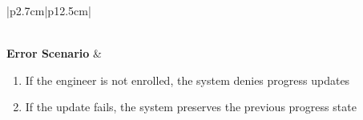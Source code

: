 \begin{table}[H]
\begin{tabular}{|p{2.7cm}|p{12.5cm}|}
\begin{minipage}[t]{\linewidth}
\begin{enumerate}[topsep=0pt,itemsep=1pt,parsep=0pt,partopsep=0pt]
                                          \end{enumerate}
                                      \end{minipage}          \\
            \hline
            \textbf{Error Scenario} & \begin{minipage}[t]{\linewidth}
                                          \begin{enumerate}[topsep=0pt,itemsep=1pt,parsep=0pt,partopsep=0pt]
                                              \item If the engineer is not enrolled, the system denies progress updates
                                              \item If the update fails, the system preserves the previous progress state
                                          \end{enumerate}
                                      \end{minipage}                  \\
            \hline
        \end{tabular}
        \label{tab:eng-mark-unit}
    \end{table}
